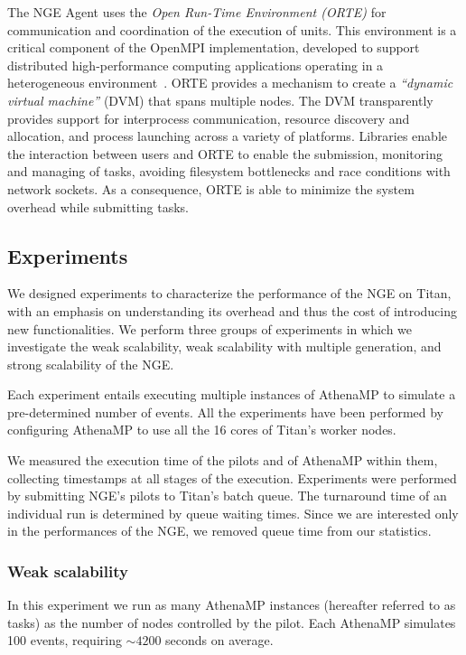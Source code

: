 \documentclass[conference]{IEEEtran}
\begin{document}
The NGE Agent uses the \emph{Open Run-Time Environment (ORTE)} for
communication and coordination of the execution of units. This environment is
a critical component of the OpenMPI implementation, developed to support
distributed high-performance computing applications operating in a
heterogeneous environment~\cite{castain05:_open_rte, cug-2016}. ORTE provides
a mechanism to create a \emph{``dynamic virtual machine''} (DVM) that spans
multiple nodes. The DVM transparently provides support for interprocess
communication, resource discovery and allocation, and process launching across
a variety of platforms. Libraries enable the interaction between users and
ORTE to enable the submission, monitoring and managing of tasks, avoiding
filesystem bottlenecks and race conditions with network sockets. As a
consequence, ORTE is able to minimize the system overhead while submitting
tasks.

\subsection{Experiments}
\label{sec:ngeExp}

We designed experiments to characterize the performance of the NGE on Titan,
with an emphasis on understanding its overhead and thus the cost of introducing
new functionalities.  We perform three groups of experiments in which we
investigate the weak scalability, weak scalability with multiple generation, and
strong scalability of the NGE.

Each experiment entails executing multiple instances of AthenaMP
to simulate a pre-determined number of events. All the experiments have been
performed by  configuring AthenaMP to use all the 16 cores  of Titan's worker
nodes.

We  measured the execution time of the pilots and of AthenaMP
within them, collecting timestamps at  all stages of the execution. Experiments
were performed  by  submitting NGE's pilots  to Titan's batch queue.  The
turnaround time of an individual run is determined by queue waiting times. Since
we are interested only in the performances of the NGE, we removed queue time
from our statistics.

\subsubsection{Weak scalability}

In this experiment  we run as many AthenaMP instances (hereafter referred to as
tasks)  as the number of nodes controlled by the pilot. Each AthenaMP simulates
100 events, requiring $\sim 4200$ seconds on average.
\end{document}
